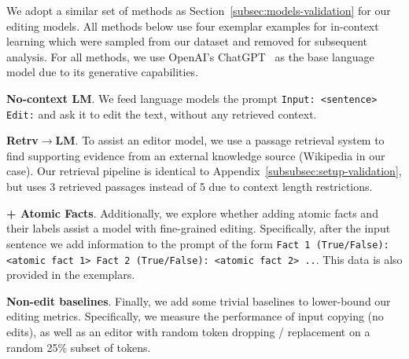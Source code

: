 \documentclass[11pt]{article}
\newcommand{\rtgShort}{Retrv$\rightarrow$LM}
\begin{document}
We adopt a similar set of methods as Section~\ref{subsec:models-validation} for our editing models. All methods below use four exemplar examples for in-context learning which were sampled from our dataset and removed for subsequent analysis. For all methods, we use OpenAI's ChatGPT~\citep{chatgpt} as the base language model due to its generative capabilities.
\vspace{.3em}

\noindent \textbf{No-context LM}. We feed language models the prompt \texttt{Input: <sentence> Edit:} and ask it to edit the text, without any retrieved context. 

\vspace{.3em}

\noindent \textbf{\rtgShort}. To assist an editor model, we use a passage retrieval system to find supporting evidence from an external knowledge source (Wikipedia in our case). Our retrieval pipeline is identical to Appendix~\ref{subsubsec:setup-validation}, but uses 3 retrieved passages instead of 5 due to context length restrictions.

\vspace{.3em}

\noindent \textbf{+ Atomic Facts}. Additionally, we explore whether adding atomic facts and their labels assist a model with fine-grained editing. Specifically, after the input sentence we add information to the prompt of the form \texttt{Fact 1 (True/False): <atomic fact 1> Fact 2 (True/False): <atomic fact 2> ..}. This data is also provided in the exemplars.

\vspace{.3em}

\noindent \textbf{Non-edit baselines}. Finally, we add some trivial baselines to lower-bound our editing metrics. Specifically, we measure the performance of input copying (no edits), as well as an editor with random token dropping / replacement on a random 25\% subset of tokens.

\end{document}
